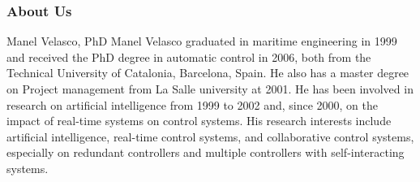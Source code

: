 \documentclass[9pt,colorlinks]{beamer}
\begin{document}
\begin{frame}[plain]\frametitle{About Us}
\begin{block}{Manel Velasco, PhD}
    \small Manel Velasco graduated in maritime engineering in 1999 and received the PhD degree in automatic control in 2006, both from the Technical University of Catalonia, Barcelona, Spain. He also has a master degree on Project management from La Salle university at 2001.  He has been involved in research on artificial intelligence from 1999 to 2002 and, since 2000, on the impact of real-time systems on control systems. His research interests include artificial intelligence, real-time control systems, and collaborative control systems, especially on redundant controllers and multiple controllers with self-interacting systems.
\end{block}

    \begin{columns}[c]


\end{columns}
\end{frame}
\end{document}
